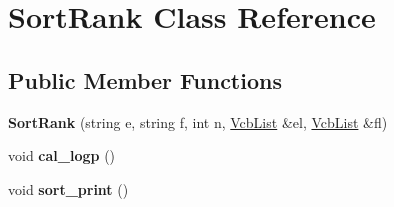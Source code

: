 \hypertarget{classSortRank}{\section{\-Sort\-Rank \-Class \-Reference}
\label{classSortRank}
}
\subsection*{\-Public \-Member \-Functions}
\begin{DoxyCompactItemize}
\item 
\hypertarget{classSortRank_a92f5186e5649751eb30ba8adefc0f9be}{{\bfseries \-Sort\-Rank} (string e, string f, int n, \hyperlink{classVcbList}{\-Vcb\-List} \&el, \hyperlink{classVcbList}{\-Vcb\-List} \&fl)}\label{classSortRank_a92f5186e5649751eb30ba8adefc0f9be}

\item 
\hypertarget{classSortRank_ab86d1fc76612396bb0138e12bcdffbad}{void {\bfseries cal\-\_\-logp} ()}\label{classSortRank_ab86d1fc76612396bb0138e12bcdffbad}

\item 
\hypertarget{classSortRank_a2f78a9de30e7ac14c1325353f4a0d683}{void {\bfseries sort\-\_\-print} ()}\label{classSortRank_a2f78a9de30e7ac14c1325353f4a0d683}

\end{DoxyCompactItemize}
